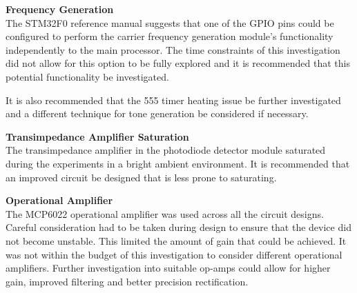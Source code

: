 \textbf{Frequency Generation}\\
The STM32F0 reference manual suggests that one of the GPIO pins could be configured to perform the carrier frequency generation module's functionality independently to the main processor. The time constraints of this investigation did not allow for this option to be fully explored and it is recommended that this potential functionality be investigated.

It is also recommended that the 555 timer heating issue be further investigated and a different technique for tone generation be considered if necessary.

\textbf{Transimpedance Amplifier Saturation}\\
The transimpedance amplifier in the photodiode detector module saturated during the experiments in a bright ambient environment. It is recommended that an improved circuit be designed that is less prone to saturating.

\textbf{Operational Amplifier}\\
The MCP6022 operational amplifier was used across all the circuit designs. Careful consideration had to be taken during design to ensure that the device did not become unstable. This limited the amount of gain that could be achieved. It was not within the budget of this investigation to consider different operational amplifiers. Further investigation into suitable op-amps could allow for higher gain, improved filtering and better precision rectification.


